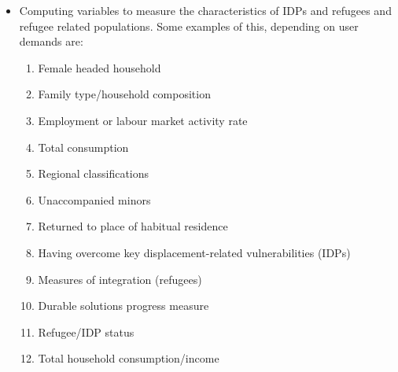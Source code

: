 \documentclass[
]{article}
\begin{document}
\begin{itemize}
\item
  Computing variables to measure the characteristics of IDPs and
  refugees and refugee related populations. Some examples of this,
  depending on user demands are:

  \begin{enumerate}
  \def\labelenumi{\arabic{enumi}.}
  \item
    Female headed household
  \item
    Family type/household composition
  \item
    Employment or labour market activity rate
  \item
    Total consumption
  \item
    Regional classifications
  \item
    Unaccompanied minors
  \item
    Returned to place of habitual residence
  \item
    Having overcome key displacement-related vulnerabilities (IDPs)
  \item
    Measures of integration (refugees)
  \item
    Durable solutions progress measure
  \item
    Refugee/IDP status
  \item
    Total household consumption/income
  \end{enumerate}
\end{itemize}
\end{document}
